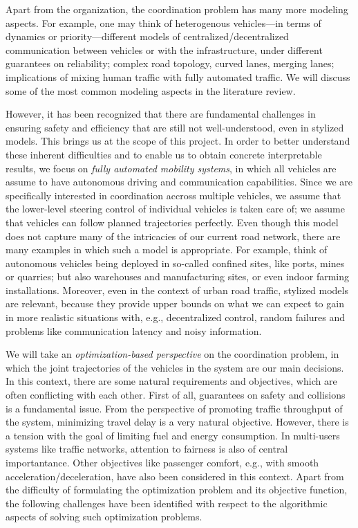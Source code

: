 \documentclass[a4paper]{report}
\theoremstyle{definition}
\theoremstyle{plain}
\begin{document}
%
Apart from the organization, the coordination problem has many more modeling
aspects. For example, one may think of heterogenous vehicles---in terms of
dynamics or priority---different models of centralized/decentralized
communication between vehicles or with the infrastructure, under different
guarantees on reliability; complex road topology, curved lanes, merging lanes;
implications of mixing human traffic with fully automated traffic.
%
We will discuss some of the most common modeling aspects in the literature
review.

%
However, it has been recognized that there are fundamental challenges in
ensuring safety and efficiency that are still not well-understood, even in
stylized models.
%
This brings us at the scope of this project.
%
%
In order to better understand these inherent difficulties and to enable us to
obtain concrete interpretable results, we focus on \emph{fully automated
  mobility systems}, in which all vehicles are assume to have autonomous driving
and communication capabilities.
%
Since we are specifically interested in coordination accross multiple vehicles,
we assume that the lower-level steering control of individual vehicles is taken
care of; we assume that vehicles can follow planned trajectories perfectly.
%
%
Even though this model does not capture many of the intricacies of our current
road network, there are many examples in which such a model is appropriate. For
example, think of autonomous vehicles being deployed in so-called confined
sites, like ports, mines or quarries; but also warehouses and manufacturing
sites, or even indoor farming installations.
%
%
Moreover, even in the context of urban road traffic, stylized models are
relevant, because they provide upper bounds on what we can expect to gain in
more realistic situations with, e.g., decentralized control, random failures and
problems like communication latency and noisy information.

%
We will take an \emph{optimization-based perspective} on the coordination problem, in
which the joint trajectories of the vehicles in the system are our main
decisions.
%
%
In this context, there are some natural requirements and objectives, which are
often conflicting with each other.
%
First of all, guarantees on safety and collisions is a fundamental issue.
%
From the perspective of promoting traffic throughput of the system, minimizing
travel delay is a very natural objective. However, there is a tension with the
goal of limiting fuel and energy consumption.
%
In multi-users systems like traffic networks, attention to fairness is also
of central importantance.
%
Other objectives like passenger comfort, e.g., with smooth
acceleration/deceleration, have also been considered in this context.
%
Apart from the difficulty of formulating the optimization problem and its
objective function, the following challenges have been identified with respect
to the algorithmic aspects of solving such optimization problems.
\end{document}
